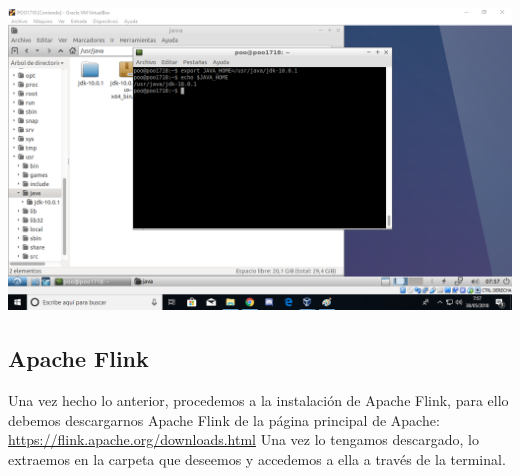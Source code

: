 \documentclass[12pt,letterpaper]{article}
\begin{document}
\begin{center}
	\includegraphics[scale=0.5]{5.png}
\end{center}

\subsection{Apache Flink}
Una vez hecho lo anterior, procedemos a la instalación de Apache Flink, para ello debemos descargarnos Apache Flink de la página principal de Apache: \url{https://flink.apache.org/downloads.html} 
Una vez lo tengamos descargado, lo extraemos en la carpeta que deseemos y accedemos a ella a través de la terminal.\\
\end{document}
